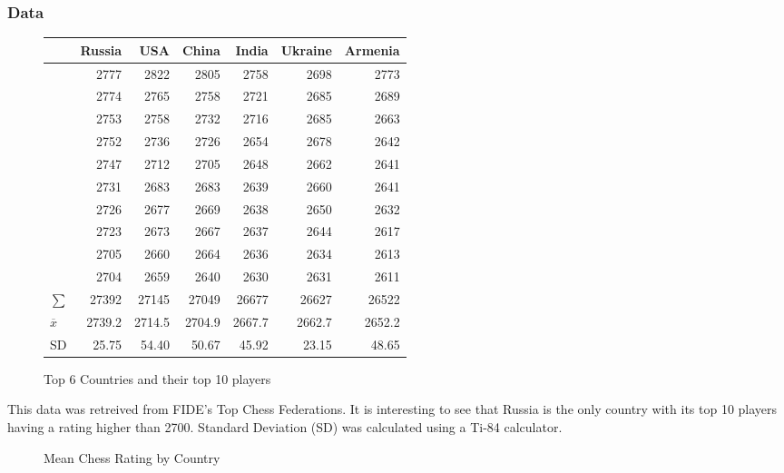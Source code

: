 \documentclass[12pt, titlepage]{article}
\begin{document}
\subsubsection{Data}
\begin{figure}[H]
  \centering
\begin{tabular}{lrrrrrr}
 & Russia & USA & China & India & Ukraine & Armenia\\
\hline
 & 2777 & 2822 & 2805 & 2758 & 2698 & 2773\\
 & 2774 & 2765 & 2758 & 2721 & 2685 & 2689\\
 & 2753 & 2758 & 2732 & 2716 & 2685 & 2663\\
 & 2752 & 2736 & 2726 & 2654 & 2678 & 2642\\
 & 2747 & 2712 & 2705 & 2648 & 2662 & 2641\\
 & 2731 & 2683 & 2683 & 2639 & 2660 & 2641\\
 & 2726 & 2677 & 2669 & 2638 & 2650 & 2632\\
 & 2723 & 2673 & 2667 & 2637 & 2644 & 2617\\
 & 2705 & 2660 & 2664 & 2636 & 2634 & 2613\\
 & 2704 & 2659 & 2640 & 2630 & 2631 & 2611\\
\(\sum\) & 27392 & 27145 & 27049 & 26677 & 26627 & 26522\\
 \(\overline{x}\) & 2739.2 & 2714.5 & 2704.9 & 2667.7 & 2662.7 & 2652.2\\
SD & 25.75 & 54.40 & 50.67 & 45.92 & 23.15 & 48.65\\
\end{tabular}
\caption{Top 6 Countries and their top 10 players}
\end{figure}

This data was retreived from FIDE's Top Chess Federations. It is interesting to see that Russia is the only country with its top 10 players having a rating higher than 2700. Standard Deviation (SD) was calculated using a Ti-84 calculator.

\begin{figure}[H]
\centering
{}
\caption{Mean Chess Rating by Country}
\end{figure}
\end{document}
